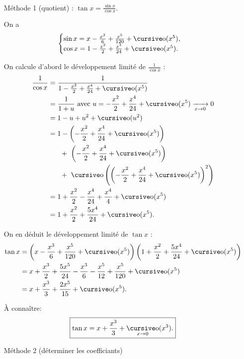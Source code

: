 \begin{exo}~\\[-3mm]
	\begin{itemize}
		\item[\sc Méthode 1] (quotient) : $\tan x = \frac{\sin x}{\cos x}$.

			On a \[
				\begin{cases}
					\sin x = x - \frac{x^3}{6} + \frac{x^5}{120} + \po(x^5),\\
					\cos x = 1 - \frac{x^2}{2} + \frac{x^4}{24} + \po(x^5).
				\end{cases}
			\]

			On calcule d'abord le développement limité de $\frac{1}{\cos x}$ :
			\begin{align*}
				\frac{1}{\cos x} &= \frac{1}{1 - \frac{x^2}{2} + \frac{x^4}{24} + \po(x^5)} \\
				&= \frac{1}{1+u} \text{ avec } u = -\frac{x^2}{2} + \frac{x^4}{24} + \po(x^5)\tendsto{x \to 0} 0 \\
				&= 1 - u + u^2 + \po(u^2) \\
				&= 1 - \left( -\frac{x^2}{2} + \frac{x^4}{24} + \po(x^5) \right) \\
				&\phantom{ = 1 -} \mathclap{+} \phantom{+} \left( -\frac{x^2}{2} + \frac{x^4}{24} + \po(x^5) \right)\\
				&\phantom{ = 1 -} \mathclap{+} \phantom{+} \po\left( \left( -\frac{x^2}{2} + \frac{x^4}{24} + \po(x^5) \right)^2 \right)\\
				&= 1+\frac{x^2}{2} -\frac{x^4}{24} + \frac{x^4}{4} + \po(x^5) \\
				&= 1 + \frac{x^2}{2} + \frac{5x^4}{24} + \po(x^5). \\
			\end{align*}

			On en déduit le développement limité de $\tan x$ :
			\begin{align*}
				\tan x &= \left(x - \frac{x^3}{6}+ \frac{x^5}{120} + \po(x^5)\right) \left( 1 + \frac{x^2}{2} + \frac{5x^4}{24} + \po(x^5) \right) \\
				&= x + \frac{x^3}{2} + \frac{5x^5}{24} - \frac{x^3}{6} - \frac{x^5}{12} + \frac{x^5}{120} + \po(x^5) \\
				&= x + \frac{x^3}{3} + \frac{2x^5}{15} + \po(x^5). \\
			\end{align*}

			{
				\color{red}
				À connaître:
				\[
					\boxed{\color{black} \tan x  = x + \frac{x^3}{3} + \po_{x\to 0}(x^3).}
				\]
			}
		\item[\sc Méthode 2](déterminer les coefficiants)


\end{itemize}
\end{exo}
